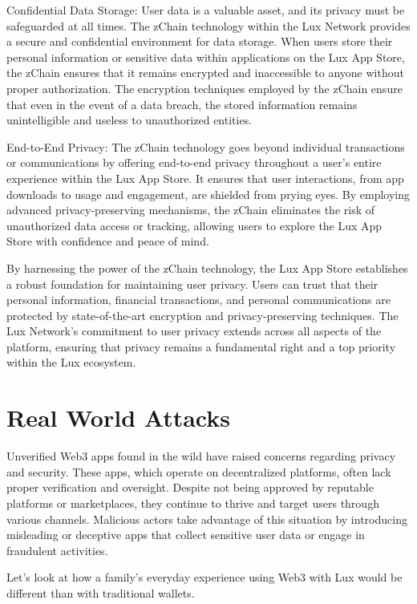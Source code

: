 \documentclass[11pt]{article}
\begin{document}
Confidential Data Storage: User data is a valuable asset, and its privacy must be safeguarded at all times. The zChain technology within the Lux Network provides a secure and confidential environment for data storage. When users store their personal information or sensitive data within applications on the Lux App Store, the zChain ensures that it remains encrypted and inaccessible to anyone without proper authorization. The encryption techniques employed by the zChain ensure that even in the event of a data breach, the stored information remains unintelligible and useless to unauthorized entities.


End-to-End Privacy: The zChain technology goes beyond individual transactions or communications by offering end-to-end privacy throughout a user's entire experience within the Lux App Store. It ensures that user interactions, from app downloads to usage and engagement, are shielded from prying eyes. By employing advanced privacy-preserving mechanisms, the zChain eliminates the risk of unauthorized data access or tracking, allowing users to explore the Lux App Store with confidence and peace of mind.


By harnessing the power of the zChain technology, the Lux App Store establishes a robust foundation for maintaining user privacy. Users can trust that their personal information, financial transactions, and personal communications are protected by state-of-the-art encryption and privacy-preserving techniques. The Lux Network's commitment to user privacy extends across all aspects of the platform, ensuring that privacy remains a fundamental right and a top priority within the Lux ecosystem.


\section{Real World Attacks}

Unverified Web3 apps found in the wild have raised concerns regarding privacy and security. These apps, which operate on decentralized platforms, often lack proper verification and oversight. Despite not being approved by reputable platforms or marketplaces, they continue to thrive and target users through various channels. Malicious actors take advantage of this situation by introducing misleading or deceptive apps that collect sensitive user data or engage in fraudulent activities.


Let's look at how a family's everyday experience using Web3 with Lux would be different than with traditional wallets.
\end{document}
